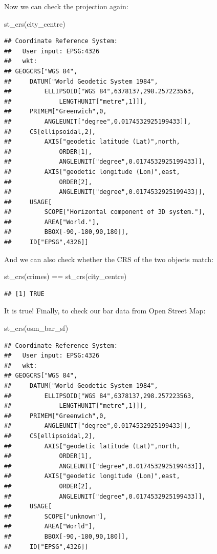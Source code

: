 \documentclass[
  krantz2]{krantz}
\makeatletter
\newenvironment{Shaded}{\begin{snugshade}}{\end{snugshade}}
\newcommand{\FunctionTok}[1]{\textcolor[rgb]{0,0,0}{#1}}
\newcommand{\NormalTok}[1]{#1}
\newcommand{\SpecialCharTok}[1]{\textcolor[rgb]{0,0,0}{#1}}
\newenvironment{kframe}{%
\medskip{}
\setlength{\fboxsep}{.8em}
 \def\at@end@of@kframe{}%
 \ifinner\ifhmode%
  \def\at@end@of@kframe{\end{minipage}}%
  \begin{minipage}{\columnwidth}%
 \fi\fi%
 \def\FrameCommand##1{\hskip\@totalleftmargin \hskip-\fboxsep
 \colorbox{shadecolor}{##1}\hskip-\fboxsep
     \hskip-\linewidth \hskip-\@totalleftmargin \hskip\columnwidth}%
 \MakeFramed {\advance\hsize-\width
   \@totalleftmargin\z@ \linewidth\hsize
   \@setminipage}}%
 {\par\unskip\endMakeFramed%
 \at@end@of@kframe}
\renewenvironment{Shaded}{\begin{kframe}}{\end{kframe}}
\makeatother
\begin{document}
Now we can check the projection again:

\begin{Shaded}
\begin{Highlighting}[]
\FunctionTok{st\_crs}\NormalTok{(city\_centre)}
\end{Highlighting}
\end{Shaded}

\begin{verbatim}
## Coordinate Reference System:
##   User input: EPSG:4326 
##   wkt:
## GEOGCRS["WGS 84",
##     DATUM["World Geodetic System 1984",
##         ELLIPSOID["WGS 84",6378137,298.257223563,
##             LENGTHUNIT["metre",1]]],
##     PRIMEM["Greenwich",0,
##         ANGLEUNIT["degree",0.0174532925199433]],
##     CS[ellipsoidal,2],
##         AXIS["geodetic latitude (Lat)",north,
##             ORDER[1],
##             ANGLEUNIT["degree",0.0174532925199433]],
##         AXIS["geodetic longitude (Lon)",east,
##             ORDER[2],
##             ANGLEUNIT["degree",0.0174532925199433]],
##     USAGE[
##         SCOPE["Horizontal component of 3D system."],
##         AREA["World."],
##         BBOX[-90,-180,90,180]],
##     ID["EPSG",4326]]
\end{verbatim}

And we can also check whether the CRS of the two objects match:

\begin{Shaded}
\begin{Highlighting}[]
\FunctionTok{st\_crs}\NormalTok{(crimes) }\SpecialCharTok{==} \FunctionTok{st\_crs}\NormalTok{(city\_centre)}
\end{Highlighting}
\end{Shaded}

\begin{verbatim}
## [1] TRUE
\end{verbatim}

It is true! Finally, to check our bar data from Open Street Map:

\begin{Shaded}
\begin{Highlighting}[]
\FunctionTok{st\_crs}\NormalTok{(osm\_bar\_sf)}
\end{Highlighting}
\end{Shaded}

\begin{verbatim}
## Coordinate Reference System:
##   User input: EPSG:4326 
##   wkt:
## GEOGCRS["WGS 84",
##     DATUM["World Geodetic System 1984",
##         ELLIPSOID["WGS 84",6378137,298.257223563,
##             LENGTHUNIT["metre",1]]],
##     PRIMEM["Greenwich",0,
##         ANGLEUNIT["degree",0.0174532925199433]],
##     CS[ellipsoidal,2],
##         AXIS["geodetic latitude (Lat)",north,
##             ORDER[1],
##             ANGLEUNIT["degree",0.0174532925199433]],
##         AXIS["geodetic longitude (Lon)",east,
##             ORDER[2],
##             ANGLEUNIT["degree",0.0174532925199433]],
##     USAGE[
##         SCOPE["unknown"],
##         AREA["World"],
##         BBOX[-90,-180,90,180]],
##     ID["EPSG",4326]]
\end{verbatim}
\end{document}
